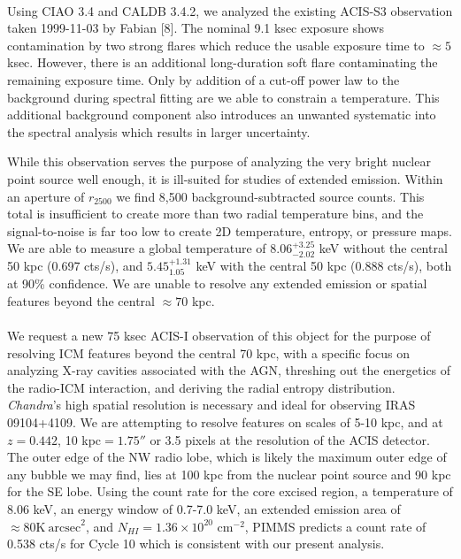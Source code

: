 \documentclass[letterpaper,11pt,twocolumn]{article}
\begin{document}
\\
Using CIAO 3.4 and CALDB 3.4.2, we analyzed the existing ACIS-S3
observation taken 1999-11-03 by Fabian
[8]. The nominal 9.1 ksec exposure shows
contamination by two strong flares which reduce the usable exposure
time to $\approx5$ ksec. However, there is an additional long-duration
soft flare contaminating the remaining exposure time. Only by
addition of a cut-off power law to the background during spectral
fitting are we able to constrain a temperature. This additional
background component also introduces an unwanted systematic into the
spectral analysis which results in larger uncertainty.

While this observation serves the purpose of analyzing the very bright
nuclear point source well enough, it is ill-suited for studies of
extended emission. Within an aperture of $r_{2500}$ we find 8,500
background-subtracted source counts. This total is insufficient to
create more than two radial temperature bins, and the signal-to-noise
is far too low to create 2D temperature, entropy, or pressure maps. We
are able to measure a global temperature of $8.06^{+3.25}_{-2.02}$ keV
without the central 50 kpc (0.697 cts/s), and $5.45^{+1.31}_{1.05}$
keV with the central 50 kpc (0.888 cts/s), both at 90\% confidence. We
are unable to resolve any extended emission or spatial features beyond
the central $\approx 70$ kpc.\\

\\
We request a new 75 ksec ACIS-I observation of this object for
the purpose of resolving ICM features beyond the central 70 kpc, with
a specific focus on analyzing X-ray cavities associated with the AGN,
threshing out the energetics of the radio-ICM interaction, and
deriving the radial entropy distribution. {\it{Chandra}}'s high
spatial resolution is necessary and ideal for observing
IRAS 09104+4109. We are attempting to resolve features on scales of
5-10 kpc, and at $z=0.442$, 10 kpc$=1.75''$ or 3.5 pixels at the
resolution of the ACIS detector. The outer edge of the NW radio lobe,
which is likely the maximum outer edge of any bubble we may find, lies
at 100 kpc from the nuclear point source and 90 kpc for the SE
lobe. Using the count rate for the core excised region, a temperature
of 8.06 keV, an energy window of 0.7-7.0 keV, an extended emission
area of $\approx80\mathrm{K~arcsec}^2$, and $N_{HI} =
1.36\times10^{20}$ cm$^{-2}$, PIMMS predicts a count rate of 0.538
cts/s for Cycle 10 which is consistent with our present analysis.
\end{document}
